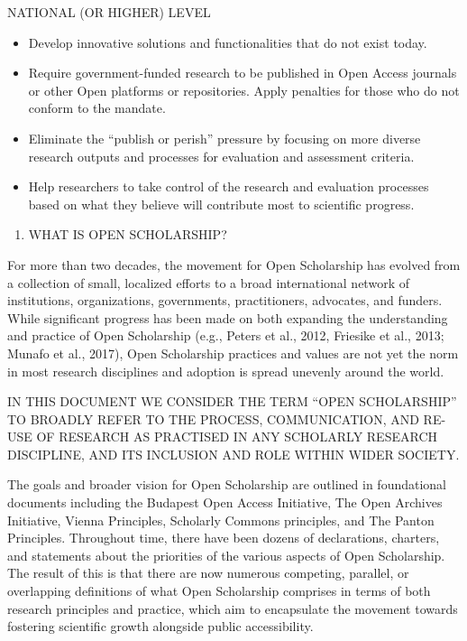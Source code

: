 \documentclass[]{article}
\providecommand{\tightlist}{%
  \setlength{\itemsep}{0pt}\setlength{\parskip}{0pt}}
\begin{document}
NATIONAL (OR HIGHER) LEVEL

\begin{itemize}
\item
  Develop innovative solutions and functionalities that do not exist
  today.
\item
  Require government-funded research to be published in Open Access
  journals or other Open platforms or repositories. Apply penalties for
  those who do not conform to the mandate.
\item
  Eliminate the ``publish or perish'' pressure by focusing on more
  diverse research outputs and processes for evaluation and assessment
  criteria.
\item
  Help researchers to take control of the research and evaluation
  processes based on what they believe will contribute most to
  scientific progress.
\end{itemize}

\begin{enumerate}
\def\labelenumi{\arabic{enumi}.}
\setcounter{enumi}{2}
\tightlist
\item
  WHAT IS OPEN SCHOLARSHIP?
\end{enumerate}

For more than two decades, the movement for Open Scholarship has evolved
from a collection of small, localized efforts to a broad international
network of institutions, organizations, governments, practitioners,
advocates, and funders. While significant progress has been made on both
expanding the understanding and practice of Open Scholarship (e.g.,
Peters et al., 2012, Friesike et al., 2013; Munafo et al., 2017), Open
Scholarship practices and values are not yet the norm in most research
disciplines and adoption is spread unevenly around the world.

IN THIS DOCUMENT WE CONSIDER THE TERM ``OPEN SCHOLARSHIP'' TO BROADLY
REFER TO THE PROCESS, COMMUNICATION, AND RE-USE OF RESEARCH AS PRACTISED
IN ANY SCHOLARLY RESEARCH DISCIPLINE, AND ITS INCLUSION AND ROLE WITHIN
WIDER SOCIETY.

The goals and broader vision for Open Scholarship are outlined in
foundational documents including the Budapest Open Access Initiative,
The Open Archives Initiative, Vienna Principles, Scholarly Commons
principles, and The Panton Principles. Throughout time, there have been
dozens of declarations, charters, and statements about the priorities of
the various aspects of Open Scholarship. The result of this is that
there are now numerous competing, parallel, or overlapping definitions
of what Open Scholarship comprises in terms of both research principles
and practice, which aim to encapsulate the movement towards fostering
scientific growth alongside public accessibility.
\end{document}
